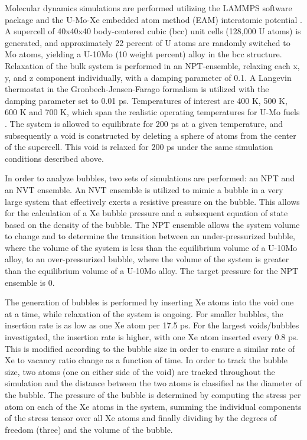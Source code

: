 \documentclass[review]{elsarticle}
\begin{document}
Molecular dynamics simulations are performed utilizing the LAMMPS \cite{plimpton1995} software package and the U-Mo-Xe embedded atom method (EAM) interatomic potential \cite{smirnovaUMo}. A supercell of 40x40x40 body-centered cubic (bcc) unit cells (128,000 U atoms) is generated, and approximately 22 percent of U atoms are randomly switched to Mo atoms, yielding a U-10Mo (10 weight percent) alloy in the bcc structure. Relaxation of the bulk system is performed in an NPT-ensemble, relaxing each x, y, and z component individually, with a damping parameter of 0.1. A Langevin thermostat in the Gronbech-Jensen-Farago \cite{gjf2013, gjf2014} formalism is utilized with the damping parameter set to 0.01 ps. Temperatures of interest are 400 K, 500 K, 600 K and 700 K, which span the realistic operating temperatures for U-Mo fuels \cite{umo_prelim_report2017}. The system is allowed to equilibrate for 200 ps at a given temperature, and subsequently a void is constructed by deleting a sphere of atoms from the center of the supercell. This void is relaxed for 200 ps under the same simulation conditions described above. 

In order to analyze bubbles, two sets of simulations are performed: an NPT and an NVT ensemble. An NVT ensemble is utilized to mimic a bubble in a very large system that effectively exerts a resistive pressure on the bubble. This allows for the calculation of a Xe bubble pressure and a subsequent equation of state based on the density of the bubble. The NPT ensemble allows the system volume to change and to determine the transition between an under-pressurized bubble, where the volume of the system is less than the equilibrium volume of a U-10Mo alloy, to an over-pressurized bubble, where the volume of the system is greater than the equilibrium volume of a U-10Mo alloy. The target pressure for the NPT ensemble is 0. 

The generation of bubbles is performed by inserting Xe atoms into the void one at a time, while relaxation of the system is ongoing. For smaller bubbles, the insertion rate is as low as one Xe atom per 17.5 ps. For the largest voids/bubbles investigated, the insertion rate is higher, with one Xe atom inserted every 0.8 ps. This is modified according to the bubble size in order to ensure a similar rate of Xe to vacancy ratio change as a function of time. In order to track the bubble size, two atoms (one on either side of the void) are tracked throughout the simulation and the distance between the two atoms is classified as the diameter of the bubble. The pressure of the bubble is determined by computing the stress per atom on each of the Xe atoms in the system, summing the individual components of the stress tensor over all Xe atoms and finally dividing by the degrees of freedom (three) and the volume of the bubble. 
\end{document}
